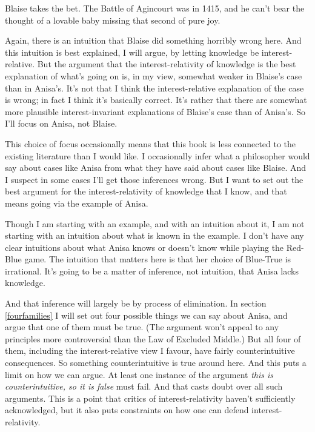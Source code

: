 \documentclass[11pt,]{book}
\begin{document}
Blaise takes the bet. The Battle of Agincourt was in 1415, and he can't bear the thought of a lovable baby missing that second of pure joy.

Again, there is an intuition that Blaise did something horribly wrong here. And this intuition is best explained, I will argue, by letting knowledge be interest-relative. But the argument that the interest-relativity of knowledge is the best explanation of what's going on is, in my view, somewhat weaker in Blaise's case than in Anisa's. It's not that I think the interest-relative explanation of the case is wrong; in fact I think it's basically correct. It's rather that there are somewhat more plausible interest-invariant explanations of Blaise's case than of Anisa's. So I'll focus on Anisa, not Blaise.

This choice of focus occasionally means that this book is less connected to the existing literature than I would like. I occasionally infer what a philosopher would say about cases like Anisa from what they have said about cases like Blaise. And I suspect in some cases I'll get those inferences wrong. But I want to set out the best argument for the interest-relativity of knowledge that I know, and that means going via the example of Anisa.

Though I am starting with an example, and with an intuition about it, I am not starting with an intuition about what is known in the example. I don't have any clear intuitions about what Anisa knows or doesn't know while playing the Red-Blue game. The intuition that matters here is that her choice of Blue-True is irrational. It's going to be a matter of inference, not intuition, that Anisa lacks knowledge.

And that inference will largely be by process of elimination. In section \ref{fourfamilies} I will set out four possible things we can say about Anisa, and argue that one of them must be true. (The argument won't appeal to any principles more controversial than the Law of Excluded Middle.) But all four of them, including the interest-relative view I favour, have fairly counterintuitive consequences. So something counterintuitive is true around here. And this puts a limit on how we can argue. At least one instance of the argument \emph{this is counterintuitive, so it is false} must fail. And that casts doubt over all such arguments. This is a point that critics of interest-relativity haven't sufficiently acknowledged, but it also puts constraints on how one can defend interest-relativity.
\end{document}
